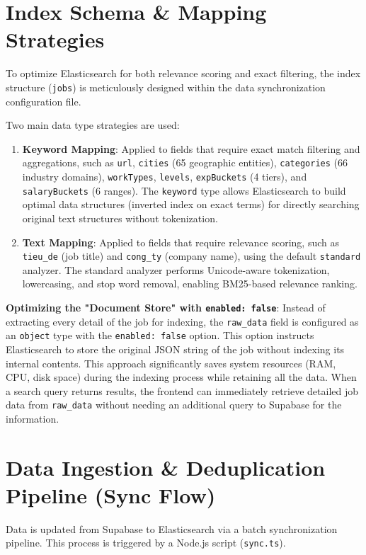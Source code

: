\section{Index Schema \& Mapping Strategies}

To optimize Elasticsearch for both relevance scoring and exact filtering, the index structure (\texttt{jobs}) is meticulously designed within the data synchronization configuration file.

Two main data type strategies are used:
\begin{enumerate}
\item \textbf{Keyword Mapping}: Applied to fields that require exact match filtering and aggregations, such as \texttt{url}, \texttt{cities} (65 geographic entities), \texttt{categories} (66 industry domains), \texttt{workTypes}, \texttt{levels}, \texttt{expBuckets} (4 tiers), and \texttt{salaryBuckets} (6 ranges). The \texttt{keyword} type allows Elasticsearch to build optimal data structures (inverted index on exact terms) for directly searching original text structures without tokenization.
\item \textbf{Text Mapping}: Applied to fields that require relevance scoring, such as \texttt{tieu\_de} (job title) and \texttt{cong\_ty} (company name), using the default \texttt{standard} analyzer. The standard analyzer performs Unicode-aware tokenization, lowercasing, and stop word removal, enabling BM25-based relevance ranking.
\end{enumerate}

\textbf{Optimizing the "Document Store" with \texttt{enabled: false}}:
Instead of extracting every detail of the job for indexing, the \texttt{raw\_data} field is configured as an \texttt{object} type with the \texttt{enabled: false} option. This option instructs Elasticsearch to store the original JSON string of the job without indexing its internal contents.
This approach significantly saves system resources (RAM, CPU, disk space) during the indexing process while retaining all the data. When a search query returns results, the frontend can immediately retrieve detailed job data from \texttt{raw\_data} without needing an additional query to Supabase for the information.

\section{Data Ingestion \& Deduplication Pipeline (Sync Flow)}

Data is updated from Supabase to Elasticsearch via a batch synchronization pipeline. This process is triggered by a Node.js script (\texttt{sync.ts}).


